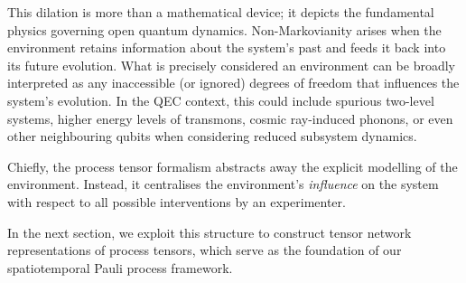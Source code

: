 This dilation is more than a mathematical device; it depicts the fundamental physics governing open quantum dynamics. Non-Markovianity arises when the environment retains information about the system’s past and feeds it back into its future evolution. What is precisely considered an environment can be broadly interpreted as any inaccessible (or ignored) degrees of freedom that influences the system's evolution. In the QEC context, this could include spurious two-level systems, higher energy levels of transmons, cosmic ray-induced phonons, or even other neighbouring qubits when considering reduced subsystem dynamics.

Chiefly, the process tensor formalism abstracts away the explicit modelling of the environment. Instead, it centralises the environment's \emph{influence} on the system with respect to all possible interventions by an experimenter.

In the next section, we exploit this structure to construct tensor network representations of process tensors, which serve as the foundation of our spatiotemporal Pauli process framework.